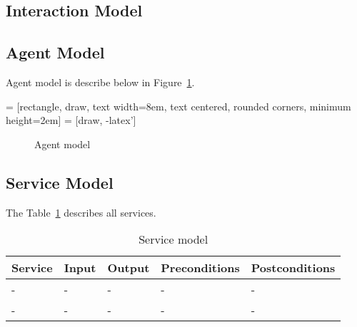 \documentclass[a4paper,11pt]{report}
\begin{document}
  
  \subsection{Interaction Model}
  
  \subsection{Agent Model}
  
  
  Agent model is describe below in Figure~\ref{figure:agent_model}.
  
 = [rectangle, draw, %
    text width=8em, text centered, rounded corners, minimum height=2em]
 = [draw, -latex']
    
\begin{figure}[ht!]
\caption{Agent model}
\label{figure:agent_model}
\end{figure}

  
  \subsection{Service Model}
  
  The Table~\ref{table:service_model} describes all services.
  
  \newcommand*{\thead}[1]{\multicolumn{1}{c}{\bfseries #1}}
  \begin{table}[ht!]
  \begin{tabular}{|l|l|l|l|l|}
  \thead{Service} & \thead{Input} & \thead{Output} & \thead{Preconditions} & \thead{Postconditions} \\\hline
  - & - & - & - & - \\ \hline
  - & - & - & - & - \\ \hline
  \end{tabular}
  
  \caption{Service model}
  \label{table:service_model}
  \end{table}
\end{document}
